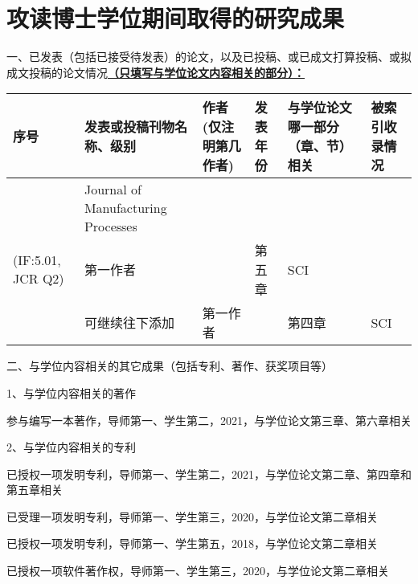 \chapter{攻读博士学位期间取得的研究成果}

一、已发表（包括已接受待发表）的论文，以及已投稿、或已成文打算投稿、或拟成文投稿的论文情况\underline{\textbf{（只填写与学位论文内容相关的部分）：}}

\begin{centering}
	\small
	\begin{longtable}{|>{\centering}m{0.5cm}|>{\centering}m{5.5cm}|>{\centering}m{2.7cm}|>{\centering}m{1.8cm}|>{\centering}m{1.8cm}|>{\centering}m{1cm}|}
		\hline 
		\textbf{序号}  & \textbf{发表或投稿刊物名称、级别}& \textbf{作者(仅注明第几作者)} & \textbf{发表年份} & \textbf{与学位论文哪一部分（章、节）相关} & \textbf{被索引收录情况}\tabularnewline
		\hline 
		1   & Journal of Manufacturing Processes\\(IF:5.01, JCR Q2) & 第一作者 &2021 & 第五章 & SCI\tabularnewline
		\hline 
		2	& 可继续往下添加 &第一作者& 2021& 第四章 & SCI \tabularnewline
		\hline
	\end{longtable}
\end{centering}

二、与学位内容相关的其它成果（包括专利、著作、获奖项目等）

1、与学位内容相关的著作

参与编写一本著作，导师第一、学生第二，2021，与学位论文第三章、第六章相关

2、与学位内容相关的专利

已授权一项发明专利，导师第一、学生第二，2021，与学位论文第二章、第四章和第五章相关

已受理一项发明专利，导师第一、学生第三，2020，与学位论文第二章相关

已授权一项发明专利，导师第一、学生第五，2018，与学位论文第二章相关

已授权一项软件著作权，导师第一、学生第三，2020，与学位论文第二章相关
